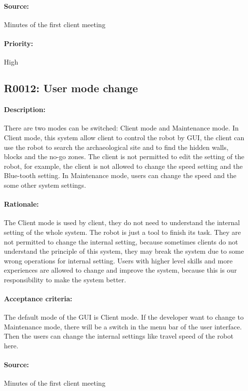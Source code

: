 \documentclass[11pt, a4paper]{report}
\begin{document}
\paragraph{Source:}
 Minutes of the first client meeting 
\paragraph{Priority:}
High 


\subsection{R0012: User mode change}
\paragraph{Description:}
There are two modes can be switched: Client mode and Maintenance mode. In Client mode, this system allow client to control the robot by GUI, the client can use the robot to search the archaeological site and to find the hidden walls, blocks and the no-go zones. The client is not permitted to edit the setting of the robot, for example, the client is not allowed to change the speed setting and the Blue-tooth setting. In Maintenance mode, users can change the speed and the some other system settings.
\paragraph{Rationale:}
The Client mode is used by client, they do not need to understand the internal setting of the whole system. The robot is just a tool to finish its task. They are not permitted to change the internal setting, because sometimes clients do not understand the principle of this system, they may break the system due to some wrong operations for internal setting. Users with higher level skills and more experiences are allowed to change and improve the system, because this is our responsibility to make the system better.
\paragraph{Acceptance criteria:}
The default mode of the GUI is Client mode. If the developer want to change to Maintenance mode, there will be a switch in the menu bar of the user interface. Then the users can change the internal settings like travel speed of the robot here.
\paragraph{Source:}
 Minutes of the first client meeting 
\end{document}

